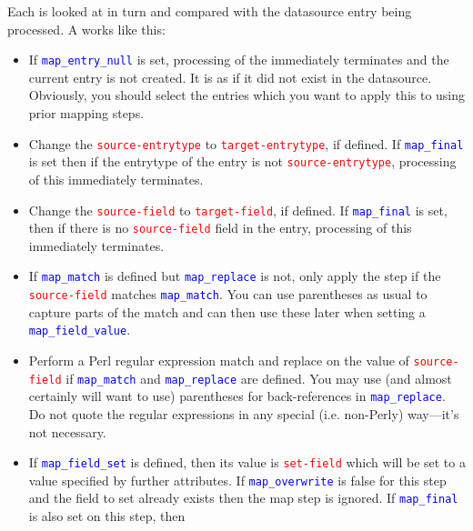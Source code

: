 \documentclass{ltxdockit}
\begin{document}
\noindent Each  is looked at in turn and compared with the
datasource entry being processed. A  works like this:

\begin{itemize}
\item If \textcolor{blue}{\texttt{map\_entry\_null}} is set,
  processing of the  immediately terminates and the current
  entry is not created. It is as if it did not exist in the
  datasource. Obviously, you should select the entries which you want
  to apply this to using prior mapping steps.
\item Change the \textcolor{red}{\texttt{source-entrytype}} to
  \textcolor{red}{\texttt{target-entrytype}}, if defined. If
  \textcolor{blue}{\texttt{map\_final}} is set then if the entrytype of the
  entry is not \textcolor{red}{\texttt{source-entrytype}}, processing of
  this  immediately terminates.
\item Change the \textcolor{red}{\texttt{source-field}} to
  \textcolor{red}{\texttt{target-field}}, if defined. If
  \textcolor{blue}{\texttt{map\_final}} is set, then if there is no
  \textcolor{red}{\texttt{source-field}} field in the entry, processing of
  this  immediately terminates.
\item If \textcolor{blue}{\texttt{map\_match}} is defined but
  \textcolor{blue}{\texttt{map\_replace}} is not, only apply the
  step if the \textcolor{red}{\texttt{source-field}} matches
  \textcolor{blue}{\texttt{map\_match}}. You can use parentheses as usual
  to capture parts of the match and can then use these later when setting a \textcolor{blue}{\texttt{map\_field\_value}}.
\item Perform a Perl regular expression match and replace on the value of
  \textcolor{red}{\texttt{source-field}} if
  \textcolor{blue}{\texttt{map\_match}} and
  \textcolor{blue}{\texttt{map\_replace}} are defined. You may use (and almost certainly
  will want to use) parentheses for back-references in \textcolor{blue}{\texttt{map\_replace}}.
  Do not quote the regular expressions in any special (i.e. non-Perly) way---it's not
  necessary.
\item If \textcolor{blue}{\texttt{map\_field\_set}} is defined, then its
  value is \textcolor{red}{\texttt{set-field}} which will be set to a value
  specified by further attributes. If
  \textcolor{blue}{\texttt{map\_overwrite}} is false for this step and the
  field to set already exists then the map step is ignored. If
  \textcolor{blue}{\texttt{map\_final}} is also set on this step, then

\end{itemize}
\end{document}
